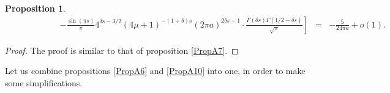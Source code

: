 \documentclass{jams-l}
\newtheorem{proposition}[theorem]{Proposition}
\theoremstyle{definition}
\theoremstyle{remark}
\numberwithin{equation}{section}
\begin{document}
\begin{proposition}
\[\begin{array}{lll}
                        \scriptstyle \qquad \qquad \qquad \left. - \frac{\sin \left( \pi s \right)}{\pi} 4^{\delta s - 3/2} \left( 4 \mu + 1 \right)^{- \left( 1 + \delta \right) s} \left( 2 \pi a \right)^{2 \delta s - 1} \cdot \frac{\Gamma \left( \delta s \right) \Gamma \left( 1/2 - \delta s \right)}{\sqrt{\pi}} \right] & \scriptstyle = & \scriptstyle - \frac{5}{24 \pi a} + o \left( 1 \right).
                    \end{array} \]
            
            \end{proposition}
            
            \begin{proof}
            
                The proof is similar to that of proposition \ref{PropA7}.
            
            \end{proof}
            
            Let us combine propositions \ref{PropA6} and \ref{PropA10} into one, in order to make some simplifications.
            
\end{document}
